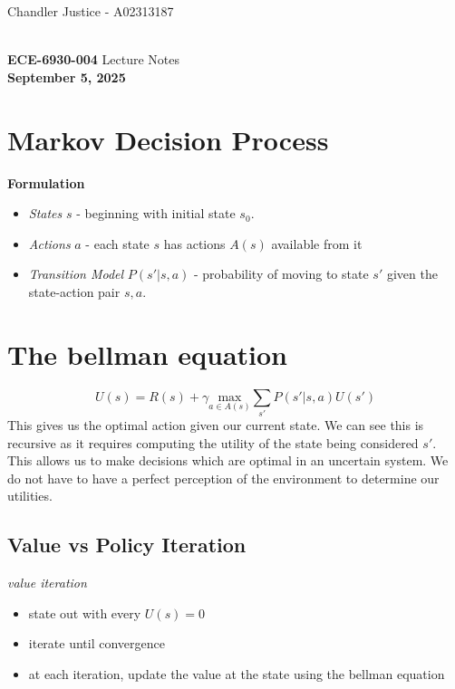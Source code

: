 \documentclass[10pt]{article}
\newcommand{\1}{\mathbb{1}}
\begin{document}
\begin{flushright}
Chandler Justice - A02313187
\end{flushright}
\noindent \underline{\hspace{3in}}\\
\textbf{ECE-6930-004} Lecture Notes \\
\textbf{September 5, 2025}\\

\section{Markov Decision Process}

\textbf{Formulation}

\begin{itemize}
    \item \textit{States} $s$ - beginning with initial state $s_0$.
    \item \textit{Actions} $a$ - each state $s$ has actions $A(s)$ available from it
    \item \textit{Transition Model} $P(s' | s,a)$ - probability of moving to state $s'$ given the state-action pair $s, a$.
\end{itemize}

\section{The bellman equation}
\[U(s) = R(s) + \gamma \underset{a \in A(s)}{\text{max}} \sum_{s'} P(s' | s,a) U(s')\]
This gives us the optimal action given our current state. We can see this is recursive as it requires computing the utility of the state being considered $s'$. This allows us to make decisions which are optimal in an uncertain system. We do not have to have a perfect perception of the environment to determine our utilities.

\subsection{Value vs Policy Iteration}

\textit{value iteration}
\begin{itemize}
    \item state out with every $U(s) = 0$
    \item iterate until convergence
    \item at each iteration, update the value at the state using the bellman equation
\end{itemize}
\end{document}

